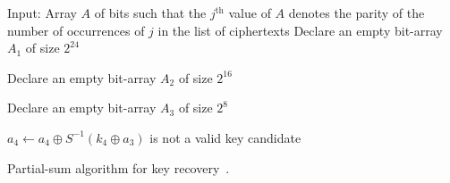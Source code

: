 \begin{algorithm}[!ht]
    \begin{algorithmic}[1] %
        \State Input: Array $A$ of bits such that the $j^{\text{th}}$ value of $A$ denotes the parity of the number of occurrences of $j$ in the list of ciphertexts
            \State Declare an empty bit-array $A_1$ of size $2^{24}$
                    \EndIf
                \EndFor

                    \State Declare an empty bit-array $A_2$ of size $2^{16}$
                        \EndIf
                    \EndFor

                        \State Declare an empty bit-array $A_3$ of size $2^{8}$
                            \EndIf
                        \EndFor

                                    \State $a_4 \gets a_4 \oplus S^{-1}(k_4 \oplus a_3)$
                                \EndIf
                            \EndFor
                                 is not a valid key candidate
                            \EndIf
                        \EndFor
                    \EndFor
             \EndFor
            \EndFor
    \end{algorithmic}
\caption{Partial-sum algorithm for key recovery~\cite{FSE:FKLSSWW00}.\label{alg:partial-sum}}
\end{algorithm}



